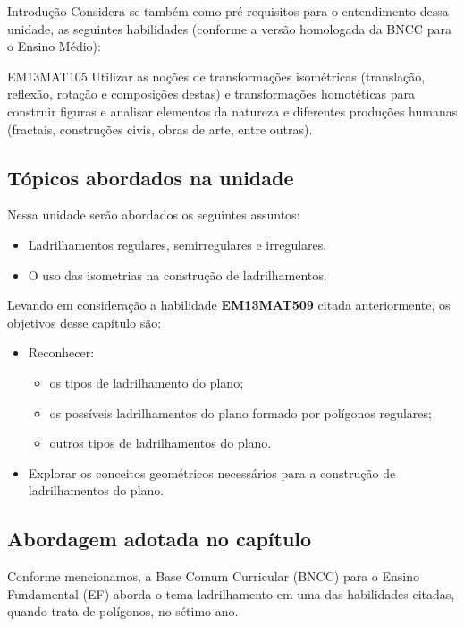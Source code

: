 \begin{apresentacao}{Introdução}
Considera-se também como pré-requisitos para o entendimento dessa unidade, as seguintes habilidades (conforme a versão homologada da BNCC para o Ensino Médio):
\begin{habilities}{EM13MAT105} 
Utilizar as noções de transformações isométricas (translação, reflexão,
rotação e composições destas) e transformações homotéticas para construir figuras e
analisar elementos da natureza e diferentes produções humanas (fractais, construções
civis, obras de arte, entre outras).
\end{habilities}

\subsection *{Tópicos abordados na unidade}
Nessa unidade serão abordados os seguintes assuntos:
\begin{itemize}
\item  Ladrilhamentos regulares, semirregulares e irregulares.
\item  O uso das isometrias na construção de ladrilhamentos.
\end{itemize}
	

Levando em consideração a habilidade \textbf{EM13MAT509} citada anteriormente, os objetivos desse capítulo são:

\vspace{-1em}
\begin{itemize}
\item Reconhecer: 
\vspace{-.5em}
\begin{itemize}
\item os tipos de ladrilhamento do plano;
\item os possíveis ladrilhamentos do plano formado por polígonos regulares;
\item outros tipos de ladrilhamentos do plano.
\end{itemize}
\vspace{-.5em}
\item Explorar os conceitos geométricos necessários para a construção de ladrilhamentos do plano.
\end{itemize}
\vspace{-1em}


\subsection *{Abordagem adotada no capítulo}

Conforme mencionamos, a Base Comum Curricular (BNCC) \citep{BNCC2018} para o Ensino Fundamental (EF) aborda o tema ladrilhamento em uma das habilidades citadas, quando trata de polígonos, no sétimo ano.


\end{apresentacao}
